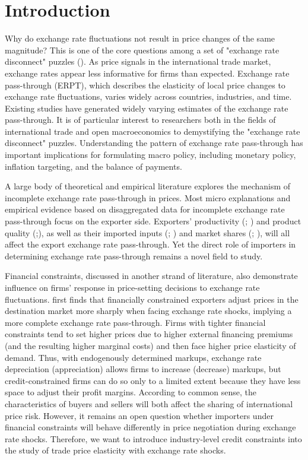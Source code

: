 \chapter{Introduction}\label{sec-1.introduction}

Why do exchange rate fluctuations not result in price changes of the same magnitude? This is one of the core questions among a set of "exchange rate disconnect" puzzles (\cite{obstfeld2000}). As price signals in the international trade market, exchange rates appear less informative for firms than expected. Exchange rate pass-through (ERPT), which describes the elasticity of local price changes to exchange rate fluctuations, varies widely across countries, industries, and time. Existing studies have generated widely varying estimates of the exchange rate pass-through. It is of particular interest to researchers both in the fields of international trade and open macroeconomics to demystifying the "exchange rate disconnect" puzzles. Understanding the pattern of exchange rate pass-through has important implications for formulating macro policy, including monetary policy, inflation targeting, and the balance of payments.

A large body of theoretical and empirical literature explores the mechanism of incomplete exchange rate pass-through in prices. Most micro explanations and empirical evidence based on disaggregated data for incomplete exchange rate pass-through focus on the exporter side. Exporters' productivity (\cite{bmm2012}; \cite{lmx2015}) and product quality (\cite{chen2016};\cite{auer2018}), as well as their imported inputs (\cite{aik2014}; \cite{wang-yu2021}) and market shares (\cite{auer2016}; \cite{devereux2017}), will all affect the export exchange rate pass-through. Yet the direct role of importers in determining exchange rate pass-through remains a novel field to study. 

Financial constraints, discussed in another strand of literature, also demonstrate influence on firms’ response in price-setting decisions to exchange rate fluctuations. \cite{strasser2013} first finds that financially constrained exporters adjust prices in the destination market more sharply when facing exchange rate shocks, implying a more complete exchange rate pass-through. Firms with tighter financial constraints tend to set higher prices due to higher external financing premiums (and the resulting higher marginal costs) and then face higher price elasticity of demand. Thus, with endogenously determined markups, exchange rate depreciation (appreciation) allows firms to increase (decrease) markups, but credit-constrained firms can do so only to a limited extent because they have less space to adjust their profit margins. According to common sense, the characteristics of buyers and sellers will both affect the sharing of international price risk. However, it remains an open question whether importers under financial constraints will behave differently in price negotiation during exchange rate shocks. Therefore, we want to introduce industry-level credit constraints into the study of trade price elasticity with exchange rate shocks.

